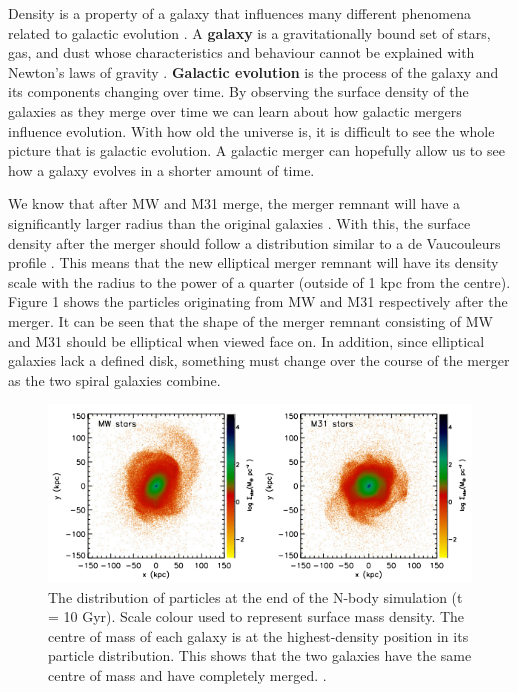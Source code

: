\documentclass[linenumbers,trackchanges,twocolumn]{aastex7}
\begin{document}
Density is a property of a galaxy that influences many different
phenomena related to galactic evolution
\citep{Torrey_Cox_Kewley_Hernquist_2012}. A \textbf{galaxy} is a
gravitationally bound set of stars, gas, and dust whose
characteristics and behaviour cannot be explained with Newton's laws
of gravity \citep{Willman_Strader_2012}. \textbf{Galactic evolution} is
the process of the galaxy and its components changing over time. By
observing the surface density of the galaxies as they merge over time we
can learn about how galactic mergers influence evolution. With how old the
universe is, it is difficult to see the whole picture that is galactic
evolution. A galactic merger can hopefully allow us to see how a galaxy
evolves in a shorter amount of time.

We know that after MW and M31 merge, the merger remnant will have a
significantly larger radius than the original galaxies
\citep{van_der_Marel_Besla_Cox_Sohn_Anderson_2012}. With this, the
surface density after the merger should follow a distribution similar
to a de Vaucouleurs profile \citep{Brooks_Christensen_2016}. This
means that the new elliptical merger remnant will have its density
scale with the radius to the power of a quarter (outside of 1 kpc from
the centre). Figure 1 shows the particles originating from MW and M31
respectively after the merger. It can be seen that the shape of the
merger remnant consisting of MW and M31 should be elliptical when
viewed face on. In addition, since elliptical galaxies lack a defined disk,
something must change over the course of the merger as the two spiral
galaxies combine.

\begin{figure}[h!]
\centering
\includegraphics[scale=0.7]{van_der_Marel_et_al_Figure.png}
\caption{The distribution of particles at the end of the N-body simulation (t = 10 Gyr). Scale colour used to represent surface mass density. The centre of mass of each galaxy is at the highest-density position in its particle distribution. This shows that the two galaxies have the same centre of mass and have completely merged. \citep{van_der_Marel_Besla_Cox_Sohn_Anderson_2012}.
\label{fig:general}}
\end{figure}
\end{document}
